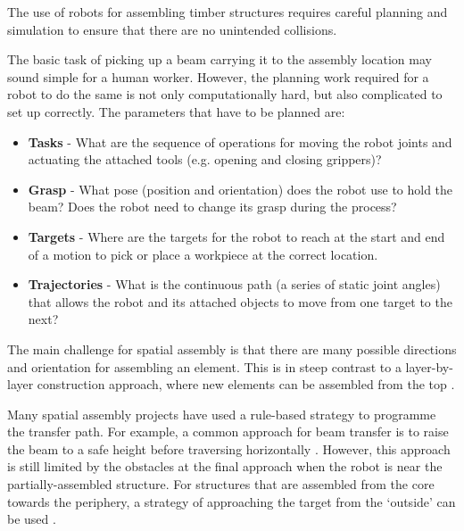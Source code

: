 The use of robots for assembling timber structures requires careful planning and simulation to ensure that there are no unintended collisions. 

The basic task of picking up a beam carrying it to the assembly location may sound simple for a human worker. However, the planning work required for a robot to do the same is not only computationally hard, but also complicated to set up correctly. The parameters that have to be planned are:

\begin{itemize}
	\item \textbf{Tasks} - What are the sequence of operations for moving the robot joints and actuating the attached tools (e.g. opening and closing grippers)?

	\item \textbf{Grasp }- What pose (position and orientation) does the robot use to hold the beam? Does the robot need to change its grasp during the process?

	\item \textbf{Targets }- Where are the targets for the robot to reach at the start and end of a motion to pick or place a workpiece at the correct location.

	\item \textbf{Trajectories }- What is the continuous path (a series of static joint angles) that allows the robot and its attached objects to move from one target to the next?

\end{itemize}
The main challenge for spatial assembly is that there are many possible directions and orientation for assembling an element. This is in steep contrast to a layer-by-layer construction approach, where new elements can be assembled from the top \parencite{apolinarskaSequentialRoof2016, gramaziokohlerresearchethzurichStackedPavilion2009}. 

Many spatial assembly projects have used a rule-based strategy to programme the transfer path. For example, a common approach for beam transfer is to raise the beam to a safe height before traversing horizontally \parencite{hackStructuralStayinplaceFormwork2020, sondergaardTopologyOptimizationRobotic2016}. However, this approach is still limited by the obstacles at the final approach when the robot is near the partially-assembled structure. For structures that are assembled from the core towards the periphery, a strategy of approaching the target from the ‘outside’ can be used \parencite{adelDesignRoboticallyFabricated2018}. 

